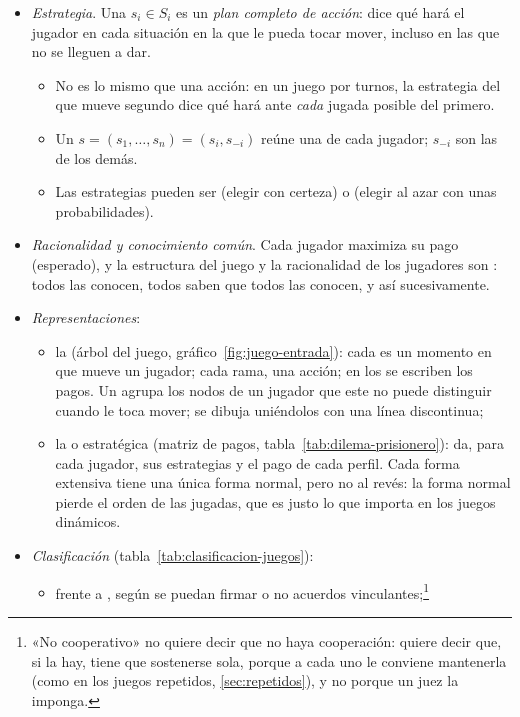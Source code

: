 \documentclass[11pt]{article}
\begin{document}
\begin{itemize}
\begin{itemize}
\begin{itemize}
    \end{itemize}
  \end{itemize}
\item \emph{Estrategia}. Una  $s_i\in S_i$ es un \emph{plan completo de acción}: dice qué hará el jugador en cada situación en la que le pueda tocar mover, incluso en las que no se lleguen a dar.
  \begin{itemize}
  \item No es lo mismo que una acción: en un juego por turnos, la estrategia del que mueve segundo dice qué hará ante \emph{cada} jugada posible del primero.
  \item Un  $s=(s_1,\dots,s_n)=(s_i,s_{-i})$ reúne una de cada jugador; $s_{-i}$ son las de los demás.
  \item Las estrategias pueden ser  (elegir con certeza) o  (elegir al azar con unas probabilidades).
  \end{itemize}
\item \emph{Racionalidad y conocimiento común}. Cada jugador maximiza su pago (esperado), y la estructura del juego y la racionalidad de los jugadores son : todos las conocen, todos saben que todos las conocen, y así sucesivamente\nocite{Aumann1976Agreeing}.
\item \emph{Representaciones}:
  \begin{itemize}
  \item la  (árbol del juego, gráfico~\ref{fig:juego-entrada}): cada  es un momento en que mueve un jugador; cada rama, una acción; en los  se escriben los pagos. Un  agrupa los nodos de un jugador que este no puede distinguir cuando le toca mover; se dibuja uniéndolos con una línea discontinua;
  \item la  o estratégica (matriz de pagos, tabla~\ref{tab:dilema-prisionero}): da, para cada jugador, sus estrategias y el pago de cada perfil. Cada forma extensiva tiene una única forma normal, pero no al revés: la forma normal pierde el orden de las jugadas, que es justo lo que importa en los juegos dinámicos.
  \end{itemize}
\item \emph{Clasificación} (tabla~\ref{tab:clasificacion-juegos}):
  \begin{itemize}
  \item {} frente a , según se puedan firmar o no acuerdos vinculantes;\footnote{«No cooperativo» no quiere decir que no haya cooperación: quiere decir que, si la hay, tiene que sostenerse sola, porque a cada uno le conviene mantenerla (como en los juegos repetidos, \ref{sec:repetidos}), y no porque un juez la imponga.}

\end{itemize}
\end{itemize}
\end{document}
